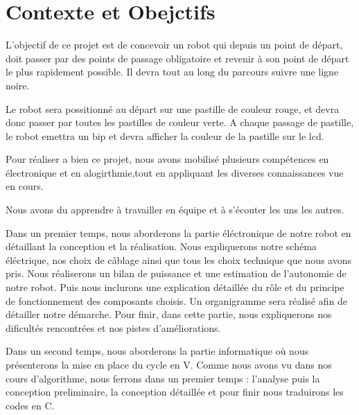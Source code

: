 \section{Contexte et Obejctifs}

L'objectif de ce projet est de concevoir un robot qui depuis un point de départ, doit passer par des points de passage obligatoire et revenir à son point de départ le plus rapidement possible. Il devra tout au long du parcours suivre une ligne noire.

Le robot sera possitionné au départ sur une pastille de couleur rouge, et devra donc passer par toutes les pastilles de couleur verte. A chaque passage de pastille, le robot emettra un bip et devra afficher la couleur de la pastille sur le lcd. 

Pour réaliser a bien ce projet, nous avons mobilisé plusieurs compétences en électronique et en alogirthmie,tout en appliquant les diverses connaissances vue en cours. 

Nous avons du apprendre à travailler en équipe et à s'écouter les uns les autres.

Dans un premier temps, nous aborderons la partie éléctronique de notre robot en détaillant la conception et la réalisation. Nous expliquerons notre schéma éléctrique, nos choix de câblage ainsi que tous les choix technique que nous avons pris. Nous réaliserons un bilan de puissance et une estimation de l'autonomie de notre robot. Puis nous inclurons une explication détaillée du rôle et du principe de fonctionnement des composants choisis. Un organigramme sera réalisé afin de détailler notre démarche. Pour finir, dans cette partie, nous expliquerons nos dificultés rencontrées et nos pistes d'améliorations.

Dans un second temps, nous aborderons la partie informatique où nous présenterons la mise en place du cycle en V. Comme nous avons vu dans nos cours d'algorithme, nous ferrons dans un premier temps : l'analyse puis la conception preliminaire, la conception détaillée et pour finir nous traduirons les codes en C.

